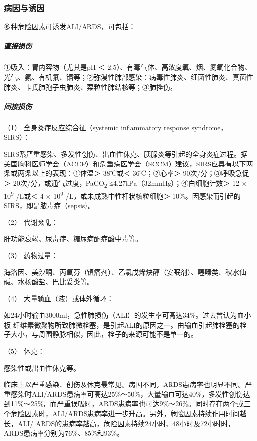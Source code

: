 \subsubsection{病因与诱因}

多种危险因素可诱发ALI/ARDS，可包括：

\subparagraph{直接损伤}

①吸入：胃内容物（尤其是pH ＜
2.5）、有毒气体、高浓度氧、烟、氮氧化合物、光气、氨、有机氟、镉等；②弥漫性肺部感染：病毒性肺炎、细菌性肺炎、真菌性肺炎、卡氏肺孢子虫肺炎、粟粒性肺结核等；③肺挫伤。

\subparagraph{间接损伤}

\hypertarget{text00078.htmlux5cux23CHP3-5-1-1-2-1}{}
（1） 全身炎症反应综合征（systemic inflammatory response
syndrome，SIRS）：

SIRS系严重感染、多发性创伤、出血性休克、胰腺炎等引起的全身炎症过程。据美国胸科医师学会（ACCP）和危重病医学会（SCCM）建议，SIRS应具有以下两条或两条以上的表现：①体温＞
38℃或＜ 36℃；②心率＞ 90次/分；③呼吸急促＞
20次/分，或通气过度，PaCO\textsubscript{2}
≤4.27kPa（32mmHg）；④白细胞计数＞ 12 × 10\textsuperscript{9} /L或＜ 4 ×
10\textsuperscript{9} /L，或未成熟中性杆状核粒细胞＞
10\%。因感染而引起的SIRS，即是脓毒症（sepsis）。

\hypertarget{text00078.htmlux5cux23CHP3-5-1-1-2-2}{}
（2） 代谢紊乱：

肝功能衰竭、尿毒症、糖尿病酮症酸中毒等。

\hypertarget{text00078.htmlux5cux23CHP3-5-1-1-2-3}{}
（3） 药物过量：

海洛因、美沙酮、丙氧芬（镇痛剂）、乙氯戊烯炔醇（安眠剂）、噻嗪类、秋水仙碱、水杨酸盐、巴比妥类等。

\hypertarget{text00078.htmlux5cux23CHP3-5-1-1-2-4}{}
（4） 大量输血（液）或体外循环：

如24小时输血3000ml，急性肺损伤（ALI）的发生率可高达34\%。过去曾认为血小板-纤维素微聚物所致肺微栓塞，是引起ALI的原因之一。由输血引起肺栓塞的栓子大小，与周围静脉相似，因此，栓子的来源可能不是单一的。

\hypertarget{text00078.htmlux5cux23CHP3-5-1-1-2-5}{}
（5） 休克：

感染性或出血性休克等。

临床上以严重感染、创伤及休克最常见。病因不同，ARDS患病率也明显不同。严重感染时ALI/ARDS患病率可高达25\%～50\%，大量输血可达40\%，多发性创伤达到11\%～25\%，而严重误吸时，ARDS患病率也可达9\%～26\%。同时存在两个或三个危险因素时，ALI/ARDS患病率进一步升高。另外，危险因素持续作用时间越长，ALI/
ARDS的患病率越高，危险因素持续24小时、48小时及72小时时，ARDS患病率分别为76\%、85\%和93\%。

